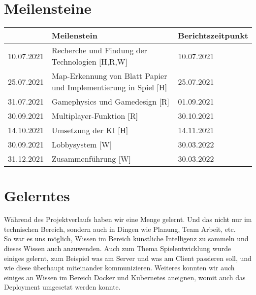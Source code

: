 \section{Meilensteine}
\begin{table}[H]
    \begin{tabular}{|l|l|l|}
    \hline
    \multicolumn{1}{|r|}{\textit{}} & \textbf{Meilenstein}                                                & \textbf{Berichtszeitpunkt} \\ \hline
    10.07.2021                      & Recherche und Findung der Technologien {[}H,R,W{]}                  & 10.07.2021                 \\ \hline
    25.07.2021                      & Map-Erkennung von Blatt Papier und Implementierung in Spiel {[}H{]} & 25.07.2021                 \\ \hline
    31.07.2021                      & Gamephysics und Gamedesign {[}R{]}                                  & 01.09.2021                 \\ \hline
    30.09.2021                      & Multiplayer-Funktion {[}R{]}                                        & 30.10.2021                 \\ \hline
    14.10.2021                      & Umsetzung der KI {[}H{]}                                            & 14.11.2021                 \\ \hline
    30.09.2021                      & Lobbysystem {[}W{]}                                                 & 30.03.2022                 \\ \hline
    31.12.2021                      & Zusammenführung {[}W{]}                                             & 30.03.2022                 \\ \hline
    \end{tabular}
\end{table}
\section{Gelerntes}
Während des Projektverlaufs haben wir eine Menge gelernt. Und das nicht nur im technischen
Bereich, sondern auch in Dingen wie Planung, Team Arbeit, etc. \\
So war es uns möglich, Wissen im Bereich künstliche Intelligenz zu sammeln und dieses Wissen auch anzuwenden. 
Auch zum Thema Spielentwicklung wurde einiges gelernt, zum Beispiel was am Server und was am Client passieren soll, und wie diese überhaupt miteinander kommunizieren.
Weiteres konnten wir auch einiges an Wissen im Bereich Docker und Kubernetes aneignen, womit auch das Deployment umgesetzt werden konnte.

